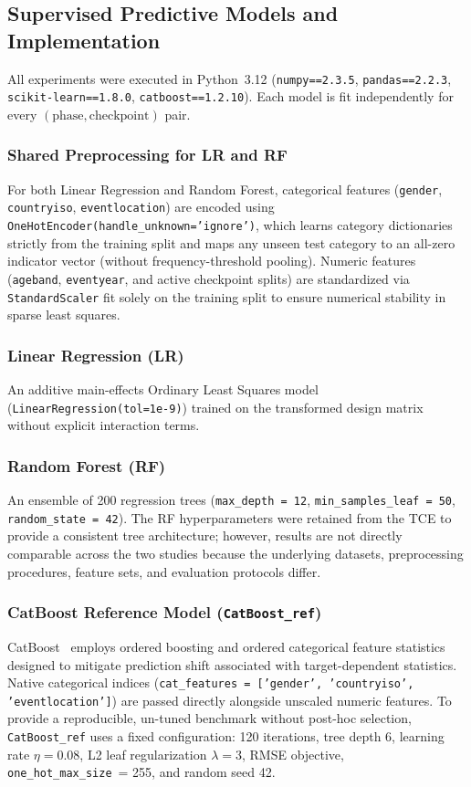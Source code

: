 \documentclass[11pt,a4paper]{article}
\begin{document}
\subsection{Supervised Predictive Models and Implementation}

All experiments were executed in Python~3.12 (\texttt{numpy==2.3.5},
\texttt{pandas==2.2.3}, \texttt{scikit-learn==1.8.0},
\texttt{catboost==1.2.10}). Each model is fit independently for every
$(\text{phase}, \text{checkpoint})$ pair.

\subsubsection{Shared Preprocessing for LR and RF}
For both Linear Regression and Random Forest, categorical features
(\texttt{gender}, \texttt{countryiso}, \texttt{eventlocation}) are
encoded using \texttt{OneHotEncoder(handle\_unknown='ignore')}, which
learns category dictionaries strictly from the training split and maps
any unseen test category to an all-zero indicator vector (without
frequency-threshold pooling). Numeric features (\texttt{ageband},
\texttt{eventyear}, and active checkpoint splits) are standardized via
\texttt{StandardScaler} fit solely on the training split to ensure
numerical stability in sparse least squares.

\subsubsection{Linear Regression (LR)}
An additive main-effects Ordinary Least Squares model
(\texttt{LinearRegression(tol=1e-9)}) trained on the transformed design
matrix without explicit interaction terms.

\subsubsection{Random Forest (RF)}
An ensemble of 200 regression trees (\texttt{max\_depth = 12},
\texttt{min\_samples\_leaf = 50}, \texttt{random\_state = 42}). The RF
hyperparameters were retained from the TCE to provide a consistent tree
architecture; however, results are not directly comparable across the
two studies because the underlying datasets, preprocessing procedures,
feature sets, and evaluation protocols differ.

\subsubsection{CatBoost Reference Model (\texttt{CatBoost\_ref})}
CatBoost~\cite{prokhorenkova2018catboost} employs ordered boosting and
ordered categorical feature statistics designed to mitigate prediction
shift associated with target-dependent statistics. Native categorical
indices (\texttt{cat\_features = ['gender', 'countryiso',
'eventlocation']}) are passed directly alongside unscaled numeric
features. To provide a reproducible, un-tuned benchmark without
post-hoc selection, \texttt{CatBoost\_ref} uses a fixed configuration:
120 iterations, tree depth 6, learning rate $\eta = 0.08$, L2 leaf
regularization $\lambda = 3$, RMSE objective,
\texttt{one\_hot\_max\_size}~= 255, and random seed 42.
\end{document}

